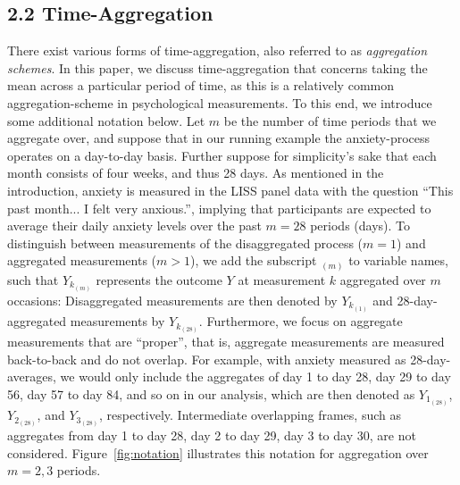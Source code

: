 \documentclass[man]{apa7} %
\begin{document}
\subsection{2.2 Time-Aggregation}
There exist various forms of time-aggregation, also referred to as \textit{aggregation schemes}. In this paper, we discuss time-aggregation that concerns taking the mean across a particular period of time, as this is a relatively common aggregation-scheme in psychological measurements. To this end, we introduce some additional notation below. Let $m$ be the number of time periods that we aggregate over, and suppose that in our running example the anxiety-process operates on a day-to-day basis. Further suppose for simplicity's sake that each month consists of four weeks, and thus 28 days. As mentioned in the introduction, anxiety is measured in the LISS panel data with the question ``This past month... I felt very anxious.'', implying that participants are expected to average their daily anxiety levels over the past $m = 28$ periods (days). To distinguish between measurements of the disaggregated process ($m = 1$) and aggregated measurements ($m > 1$), we add the subscript $_{(m)}$ to variable names, such that $Y_{k_{(m)}}$ represents the outcome $Y$ at measurement $k$ aggregated over $m$ occasions: Disaggregated measurements are then denoted by $Y_{k_{(1)}}$ and 28-day-aggregated measurements by $Y_{k_{(28)}}$. Furthermore, we focus on aggregate measurements that are ``proper'', that is, aggregate measurements are measured back-to-back and do not overlap. For example, with anxiety measured as 28-day-averages, we would only include the aggregates of day 1 to day 28, day 29 to day 56, day 57 to day 84, and so on in our analysis, which are then denoted as $Y_{1_{(28)}}$, $Y_{2_{(28)}}$, and $Y_{3_{(28)}}$, respectively. Intermediate overlapping frames, such as aggregates from day 1 to day 28, day 2 to day 29, day 3 to day 30, are not considered. Figure~\ref{fig:notation} illustrates this notation for aggregation over $m = 2, 3$ periods. 
\end{document}
